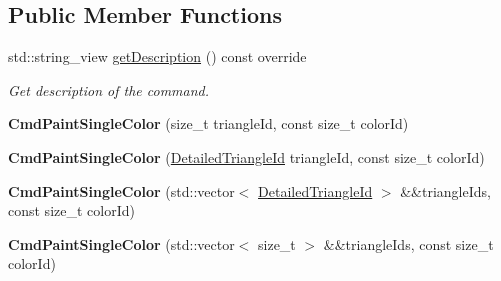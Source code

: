 \subsection*{Public Member Functions}
\begin{DoxyCompactItemize}
\item 
\mbox{\label{classpepr3d_1_1_cmd_paint_single_color_a7abd306f996257ff738b0ffdb278ca0a}} 
std\+::string\+\_\+view \mbox{\hyperlink{classpepr3d_1_1_cmd_paint_single_color_a7abd306f996257ff738b0ffdb278ca0a}{get\+Description}} () const override
\begin{DoxyCompactList}\small\item\em Get description of the command. \end{DoxyCompactList}\item 
\mbox{\label{classpepr3d_1_1_cmd_paint_single_color_a9395fff6681c03f0e73348ee3771173e}} 
{\bfseries Cmd\+Paint\+Single\+Color} (size\+\_\+t triangle\+Id, const size\+\_\+t color\+Id)
\item 
\mbox{\label{classpepr3d_1_1_cmd_paint_single_color_a9c8d4ac95c5b65c02a75ca2f1e66191e}} 
{\bfseries Cmd\+Paint\+Single\+Color} (\mbox{\hyperlink{structpepr3d_1_1_detailed_triangle_id}{Detailed\+Triangle\+Id}} triangle\+Id, const size\+\_\+t color\+Id)
\item 
\mbox{\label{classpepr3d_1_1_cmd_paint_single_color_a80de132d4862eb3b1f9af0b8dc35c3a9}} 
{\bfseries Cmd\+Paint\+Single\+Color} (std\+::vector$<$ \mbox{\hyperlink{structpepr3d_1_1_detailed_triangle_id}{Detailed\+Triangle\+Id}} $>$ \&\&triangle\+Ids, const size\+\_\+t color\+Id)
\item 
\mbox{\label{classpepr3d_1_1_cmd_paint_single_color_ad8c2b3b0d9c7d50b63130ce7e7400125}} 
{\bfseries Cmd\+Paint\+Single\+Color} (std\+::vector$<$ size\+\_\+t $>$ \&\&triangle\+Ids, const size\+\_\+t color\+Id)
\end{DoxyCompactItemize}
